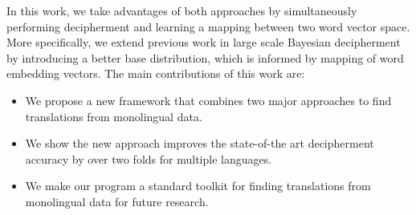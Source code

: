 In this work, we take advantages of both approaches by simultaneously performing decipherment and learning a mapping between two word vector space. More specifically, we extend previous work in large scale Bayesian decipherment by introducing a better base distribution, which is informed by mapping of word embedding vectors. The main contributions of this work are:

\begin{itemize}
\item We propose a new framework that combines two major approaches to find translations from monolingual data.

\item We show the new approach improves the state-of-the art decipherment accuracy by over two folds for multiple languages. 

\item We make our program a standard toolkit for finding translations from monolingual data for future research.
\end{itemize}